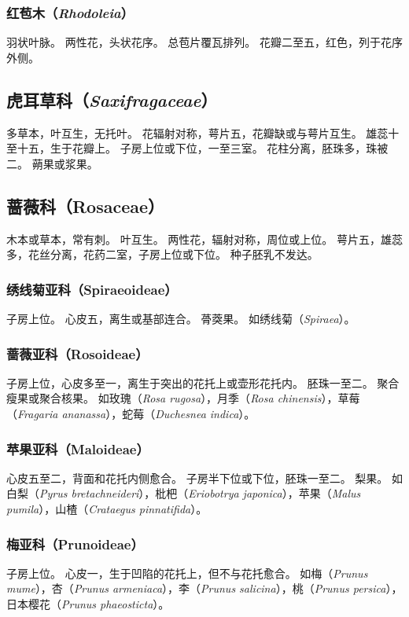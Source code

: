 \documentclass[11pt]{article}
\begin{document}
\begin{sloppypar}
\subsubsection{红苞木（\textit{Rhodoleia}）}
羽状叶脉。
两性花，头状花序。
总苞片覆瓦排列。
花瓣二至五，红色，列于花序外侧。

\subsection{虎耳草科（\textit{Saxifragaceae}）}
多草本，叶互生，无托叶。
花辐射对称，萼片五，花瓣缺或与萼片互生。
雄蕊十至十五，生于花瓣上。
子房上位或下位，一至三室。
花柱分离，胚珠多，珠被二。
蒴果或浆果。

\subsection{蔷薇科（Rosaceae）}
木本或草本，常有刺。
叶互生。
两性花，辐射对称，周位或上位。
萼片五，雄蕊多，花丝分离，花药二室，子房上位或下位。
种子胚乳不发达。

\subsubsection{绣线菊亚科（Spiraeoideae）}
子房上位。
心皮五，离生或基部连合。
蓇葖果。
如绣线菊（\textit{Spiraea}）。

\subsubsection{蔷薇亚科（Rosoideae）}
子房上位，心皮多至一，离生于突出的花托上或壶形花托内。
胚珠一至二。
聚合瘦果或聚合核果。
如玫瑰（\textit{Rosa rugosa}），月季（\textit{Rosa chinensis}），草莓（\textit{Fragaria ananassa}），蛇莓（\textit{Duchesnea indica}）。

\subsubsection{苹果亚科（Maloideae）}
心皮五至二，背面和花托内侧愈合。
子房半下位或下位，胚珠一至二。
梨果。
如白梨（\textit{Pyrus bretachneideri}），枇杷（\textit{Eriobotrya japonica}），苹果（\textit{Malus pumila}），山楂（\textit{Crataegus pinnatifida}）。

\subsubsection{梅亚科（Prunoideae）}
子房上位。
心皮一，生于凹陷的花托上，但不与花托愈合。
如梅（\textit{Prunus mume}），杏（\textit{Prunus armeniaca}），李（\textit{Prunus salicina}），桃（\textit{Prunus persica}），日本樱花（\textit{Prunus phaeosticta}）。


\end{sloppypar}
\end{document}
